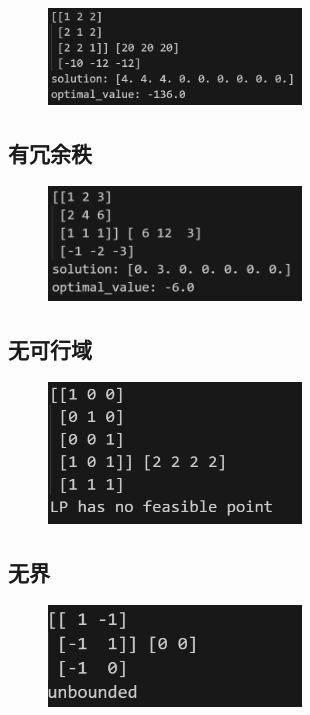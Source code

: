 \documentclass[10pt,a4paper,oneside]{article}
\begin{document}
\begin{figure}[H]
    \centering
    \includegraphics[width=0.6\textwidth]{屏幕截图 2024-11-05 114502.png}
\end{figure}

\subsection{有冗余秩}

\begin{figure}[H]
    \centering
    \includegraphics[width=0.6\textwidth]{屏幕截图 2024-11-05 114539.png}
\end{figure}

\subsection{无可行域}

\begin{figure}[H]
    \centering
    \includegraphics[width=0.6\textwidth]{屏幕截图 2024-11-05 114529.png}
\end{figure}

\subsection{无界}

\begin{figure}[H]
    \centering
    \includegraphics[width=0.6\textwidth]{屏幕截图 2024-11-05 114511.png}
\end{figure}
\end{document}
